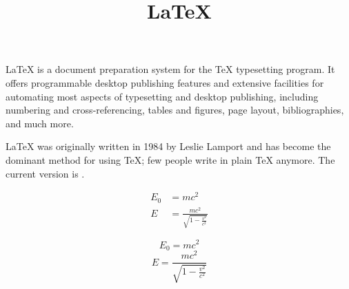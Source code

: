 \documentclass[12pt]{article}
\title{\LaTeX}
\date{}
\begin{document}
  \maketitle
  \LaTeX{} is a document preparation system for
  the \TeX{} typesetting program. It offers
  programmable desktop publishing features and
  extensive facilities for automating most
  aspects of typesetting and desktop publishing,
  including numbering and  cross-referencing,
  tables and figures, page layout,
  bibliographies, and much more.
  
  \LaTeX{} was
  originally written in 1984 by Leslie Lamport
  and has become the  dominant method for using
  \TeX; few people write in plain \TeX{} anymore. The current version is \LaTeXe.

  \begin{align}
    E_0 &= mc^2                              \\
    E &= \frac{mc^2}{\sqrt{1-\frac{v^2}{c^2}}}
  \end{align}
  
  $$ E_0 = mc^2 $$
  $$ E = \frac{mc^2}{\sqrt{1-\frac{v^2}{c^2}}}$$
\end{document}

